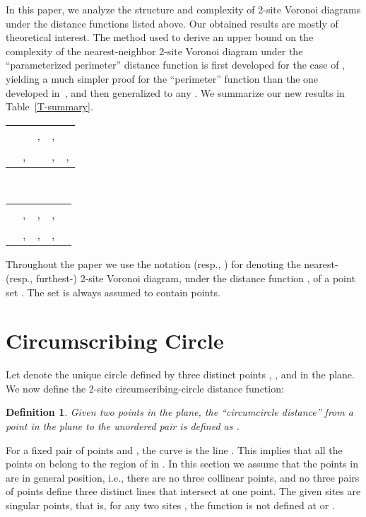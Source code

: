 \documentclass[10pt, conference, compsocconf]{IEEEtran}
\newtheorem{definition}{Definition}
\begin{document}
In this paper, we analyze the structure and complexity of 2-site Voronoi
diagrams under the distance functions listed above.  Our obtained results are
mostly of theoretical interest.  The method used to derive an upper bound on
the complexity of the nearest-neighbor 2-site Voronoi diagram under the ``parameterized
perimeter'' distance function is first developed for the case of ,
yielding a much simpler proof for the ``perimeter'' function than the one
developed in~\cite{HB09}, and then generalized to any .
We summarize our new results in Table~\ref{T-summary}.
\begin{table*}
   \centering
   \begin{tabular}{|c||c|c|c|c|}
      \hline
       &  &  &  &  \\
      \hline
       &  & ,  &
         ,  &  \\
      \hline
       & ,  &  &
         ,  & ,  \\
      \hline
   \end{tabular} \\
   \begin{tabular}{|c||c|c|c|c|}
      \hline
       &  &  &  &  \\
      \hline
       & ,  &
         ,  & ,  &
          \\
      \hline
       & ,  &
         ,  & ,  & \\
      \hline
   \end{tabular}
   \caption{Our results:  Worst-case combinatorial complexities of 2-site
            Voronoi diagrams of a set  of  points with respect to
            different distance functions}
   \label{T-summary}
\end{table*}

Throughout the paper we use the notation  (resp.,
) for denoting the nearest- (resp., furthest-) 2-site Voronoi
diagram, under the distance function , of a point set .
The set  is always assumed to contain  points.



\section{Circumscribing Circle}

\label{S-circum-cir}

Let  denote the unique circle defined by three distinct
points , , and  in the plane.  We now define the 2-site
circumscribing-circle distance function:
\begin{definition}
   Given two points  in the plane, the ``circumcircle distance''
    from a point  in the plane to the unordered pair  is
   defined as .
\end{definition}
For a fixed pair of points  and , the curve
 is the line .
This implies that all the points on  belong to
the region of  in . In this
section we assume that the points in  are in general position,
i.e., there are no three collinear points, and no three pairs of
points define three distinct lines that intersect at one point.
The given sites are singular points, that is, for any two sites
, the function  is not defined at  or .
\end{document}
